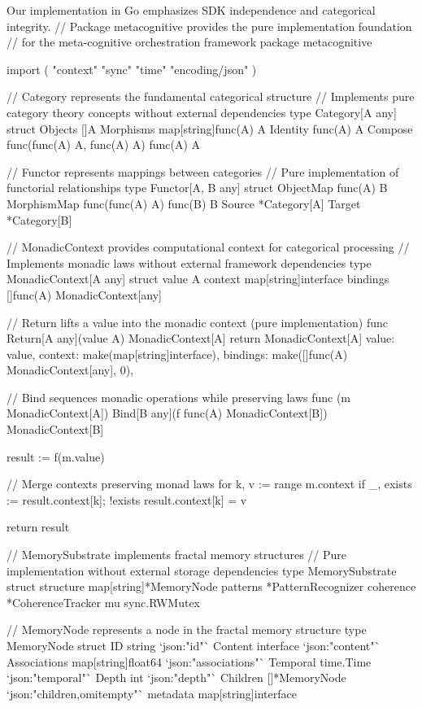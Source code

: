 Our implementation in Go emphasizes SDK independence and categorical integrity.
// Package metacognitive provides the pure implementation foundation
// for the meta-cognitive orchestration framework
package metacognitive

import (
    "context"
    "sync"
    "time"
    "encoding/json"
)

// Category represents the fundamental categorical structure
// Implements pure category theory concepts without external dependencies
type Category[A any] struct {
    Objects    []A
    Morphisms  map[string]func(A) A
    Identity   func(A) A
    Compose    func(func(A) A, func(A) A) func(A) A
}

// Functor represents mappings between categories
// Pure implementation of functorial relationships
type Functor[A, B any] struct {
    ObjectMap   func(A) B
    MorphismMap func(func(A) A) func(B) B
    Source      *Category[A]
    Target      *Category[B]
}

// MonadicContext provides computational context for categorical processing
// Implements monadic laws without external framework dependencies
type MonadicContext[A any] struct {
    value    A
    context  map[string]interface{}
    bindings []func(A) MonadicContext[any]
}

// Return lifts a value into the monadic context (pure implementation)
func Return[A any](value A) MonadicContext[A] {
    return MonadicContext[A]{
        value:    value,
        context:  make(map[string]interface{}),
        bindings: make([]func(A) MonadicContext[any], 0),
    }
}

// Bind sequences monadic operations while preserving laws
func (m MonadicContext[A]) Bind[B any](f func(A) MonadicContext[B]) MonadicContext[B] {
    result := f(m.value)

    // Merge contexts preserving monad laws
    for k, v := range m.context {
        if _, exists := result.context[k]; !exists {
            result.context[k] = v
        }
    }

    return result
}

// MemorySubstrate implements fractal memory structures
// Pure implementation without external storage dependencies
type MemorySubstrate struct {
    structure    map[string]*MemoryNode
    patterns     *PatternRecognizer
    coherence    *CoherenceTracker
    mu           sync.RWMutex
}

// MemoryNode represents a node in the fractal memory structure
type MemoryNode struct {
    ID          string                 `json:"id"`
    Content     interface{}            `json:"content"`
    Associations map[string]float64     `json:"associations"`
    Temporal    time.Time              `json:"temporal"`
    Depth       int                    `json:"depth"`
    Children    []*MemoryNode          `json:"children,omitempty"`
    metadata    map[string]interface{}
}

